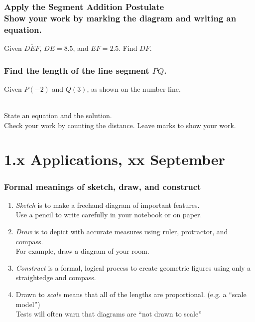   \frame
  {
    \frametitle{Apply the Segment Addition Postulate \\
    Show your work by marking the diagram and writing an equation.}
      Given $\overline{DEF}$, $DE=8.5$, and $EF=2.5$. Find ${DF}$.\\[0.75cm]
         \vspace{4cm}
  }

  \frame
  {
    \frametitle{Find the length of the line segment $\overline{PQ}$.}
    Given $P(-2)$ and $Q(3)$, as shown on the number line. \\[0.25cm]
       \\
      State an equation and the solution. \\
  Check your work by counting the distance. Leave marks to show your work. \vspace{5cm}  
  }

\section{1.x Applications, xx September}
\frame
{
  \frametitle{Formal meanings of sketch, draw, and construct}
  \begin{enumerate}
    \item \emph{Sketch} is to make a freehand diagram of important features. \\[0.15cm]
    Use a pencil to write carefully in your notebook or on paper.  \smallskip
    \item \emph{Draw}  is to depict with accurate measures using ruler, protractor, and compass.\\[0.15cm]
    For example, draw a diagram of your room. \smallskip
    \item \emph{Construct} is a formal, logical process to create geometric figures using only a straightedge and compass. \smallskip
    \item Drawn to \emph{scale} means that all of the lengths are proportional. (e.g. a ``scale model'')\\[0.15cm]
    Tests will often warn that diagrams are ``not drawn to scale''
  \end{enumerate}
}


